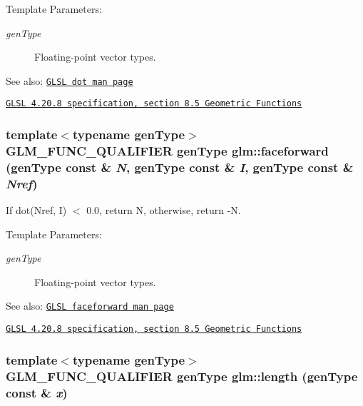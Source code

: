 \begin{Desc}
\item[Template Parameters:]
\begin{description}
\item[{\em genType}]Floating-point vector types.\end{description}
\end{Desc}
\begin{Desc}
\item[See also:]\href{http://www.opengl.org/sdk/docs/manglsl/xhtml/dot.xml}{\tt GLSL dot man page} 

\href{http://www.opengl.org/registry/doc/GLSLangSpec.4.20.8.pdf}{\tt GLSL 4.20.8 specification, section 8.5 Geometric Functions} \end{Desc}
\hypertarget{group__core__func__geometric_ga4cdf87f6fd660e7086776d9abb6cbae}{
\subsubsection[faceforward]{\setlength{\rightskip}{0pt plus 5cm}template$<$typename genType$>$ GLM\_\-FUNC\_\-QUALIFIER genType glm::faceforward (genType const \& {\em N}, \/  genType const \& {\em I}, \/  genType const \& {\em Nref})}}
\label{group__core__func__geometric_ga4cdf87f6fd660e7086776d9abb6cbae}


If dot(Nref, I) $<$ 0.0, return N, otherwise, return -N.

\begin{Desc}
\item[Template Parameters:]
\begin{description}
\item[{\em genType}]Floating-point vector types.\end{description}
\end{Desc}
\begin{Desc}
\item[See also:]\href{http://www.opengl.org/sdk/docs/manglsl/xhtml/faceforward.xml}{\tt GLSL faceforward man page} 

\href{http://www.opengl.org/registry/doc/GLSLangSpec.4.20.8.pdf}{\tt GLSL 4.20.8 specification, section 8.5 Geometric Functions} \end{Desc}
\hypertarget{group__core__func__geometric_gd73a94d9c967e619e670156356e93b7e}{
\subsubsection[length]{\setlength{\rightskip}{0pt plus 5cm}template$<$typename genType$>$ GLM\_\-FUNC\_\-QUALIFIER genType glm::length (genType const \& {\em x})}}
\label{group__core__func__geometric_gd73a94d9c967e619e670156356e93b7e}


